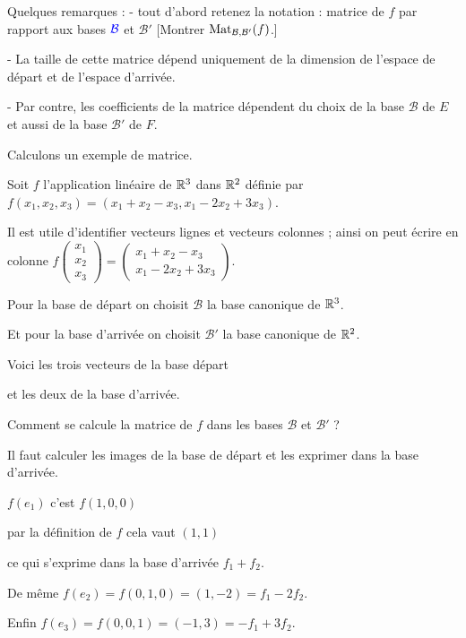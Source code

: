 Quelques remarques :
  - tout d'abord retenez la notation : matrice de $f$ par
rapport aux bases ${\color{blue}\mathcal{B}}$ et $\mathcal{B}'$
[Montrer $\mathop{\mathrm{Mat}}\nolimits_{\mathcal{B},\mathcal{B}'}(f)$.]

  - La taille de cette matrice dépend
  uniquement de la dimension de l'espace de départ et de l'espace d'arrivée.
  
  -  Par contre, les coefficients de la matrice dépendent 
  du choix de la base $\mathcal{B}$ de $E$ et aussi de la base $\mathcal{B}'$ de $F$.

\diapo

Calculons un exemple de matrice.


Soit $f$ l'application linéaire de $\mathbb{R}^3$ dans $\mathbb{R}^2$ définie
par 
$f(x_1,x_2,x_3)=(x_1+x_2-x_3, x_1-2x_2+3x_3)$.

\change
Il est utile d'identifier vecteurs lignes et vecteurs colonnes ; 
ainsi on peut écrire en colonne  
$f \left(\begin{smallmatrix} x_1\\x_2\\x_3 \end{smallmatrix}\right) 
= \left(\begin{smallmatrix} x_1+x_2-x_3 \\ x_1-2x_2+3x_3 \end{smallmatrix}\right)$.

\change
Pour la base de départ on choisit $\mathcal{B}$ la base canonique de $\mathbb{R}^3$.

\change
Et pour la base d'arrivée on choisit $\mathcal{B}'$ 
la base canonique de $\mathbb{R}^2$. 

\change
Voici les trois vecteurs de la base départ

\change
et les deux de la base d'arrivée.

\change
Comment se calcule la matrice de $f$ dans les bases $\mathcal{B}$ et $\mathcal{B}'$ ?

\change
Il faut calculer les images de la base de départ et les exprimer dans la base d'arrivée.

\change
$f(e_1)$ c'est $f(1,0,0)$

\change
par la définition de $f$ cela vaut $(1,1)$

\change
ce qui s'exprime dans la base d'arrivée $f_1+f_2$. 

\change
De même $f(e_2) = f(0,1,0) =(1,-2)=f_1-2f_2$.

\change
Enfin $f(e_3) = f(0,0,1) =(-1,3)=-f_1+3f_2$.

